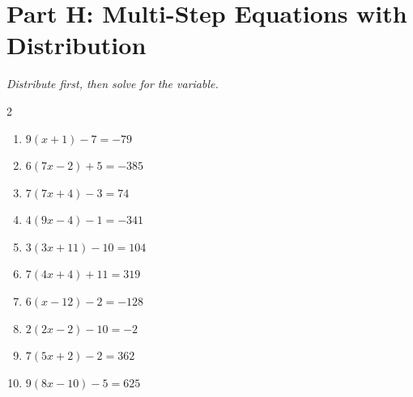 \documentclass[11pt]{article}
\begin{document}
\section*{Part H: Multi-Step Equations with Distribution}
\noindent\textit{Distribute first, then solve for the variable.}
\begin{multicols}{2}
\begin{enumerate}
  \item $9(x + 1) - 7 = -79$
  \vspace{1.8cm}
  \item $6(7x - 2) + 5 = -385$
  \vspace{1.8cm}
  \item $7(7x + 4) - 3 = 74$
  \vspace{1.8cm}
  \item $4(9x - 4) - 1 = -341$
  \vspace{1.8cm}
  \item $3(3x + 11) - 10 = 104$
  \vspace{1.8cm}
  \item $7(4x + 4) + 11 = 319$
  \vspace{1.8cm}
  \item $6(x - 12) - 2 = -128$
  \vspace{1.8cm}
  \item $2(2x - 2) - 10 = -2$
  \vspace{1.8cm}
  \item $7(5x + 2) - 2 = 362$
  \vspace{1.8cm}
  \item $9(8x - 10) - 5 = 625$
  \vspace{1.8cm}
\end{enumerate}
\end{multicols}
\end{document}
